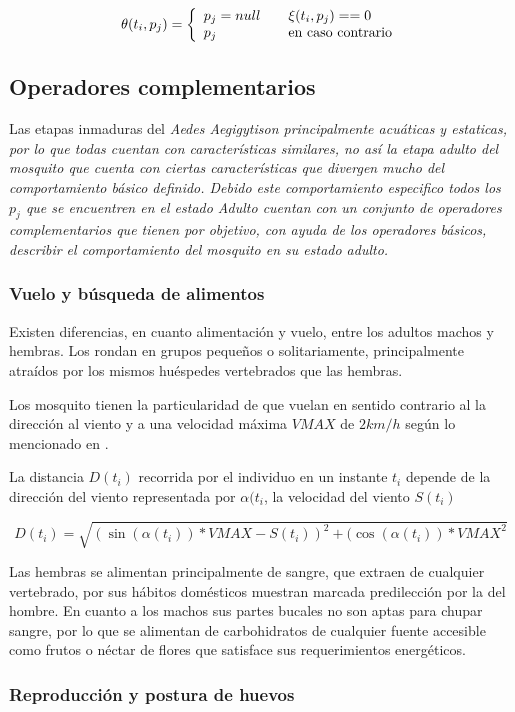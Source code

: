 \begin{equation}
\theta (t_{i}, p_{j}) = \left\{
  \begin{array}{l l}
    p_{j} = null & \quad \xi(t_{i}, p_{j}) == 0 \\
    p_{j} & \quad \text{en caso contrario}
  \end{array} \right.
\end{equation}

\subsection{Operadores complementarios}
Las etapas inmaduras del \em Aedes Aegigyti\em son principalmente acuáticas
y estaticas, por lo que todas cuentan con características similares, no
así la etapa adulto del mosquito que cuenta con ciertas características
que divergen mucho del comportamiento básico definido. Debido este
comportamiento especifico todos los $p_{j}$ que se encuentren en el estado
\em Adulto \em cuentan con un conjunto de operadores complementarios que
tienen por objetivo, con ayuda de los operadores básicos, describir el
comportamiento del mosquito en su estado adulto.

\subsubsection{Vuelo y búsqueda de alimentos}
Existen diferencias, en cuanto alimentación y vuelo, entre los adultos
machos y hembras. Los rondan en grupos pequeños o solitariamente,
principalmente atraídos por los mismos huéspedes vertebrados que las hembras.

Los mosquito tienen la particularidad de que vuelan en sentido contrario
al la dirección al viento y a una velocidad máxima $VMAX$ de $2 km/h$ según lo
mencionado en \cite{web-site:speedAnimals}.

La distancia $D(t_{i})$ recorrida por el individuo en un instante $t_{i}$
depende de la dirección del viento representada por $\alpha(t_{i}$, la
velocidad del viento $S(t_{i})$

\begin{equation}
 D (t_{i}) = \sqrt{{(\sin(\alpha(t_{i})) * VMAX  - S(t_{i}))}^{2}
  + {(\cos(\alpha(t_{i})) * VMAX} ^{2} }
\end{equation}

Las hembras se alimentan principalmente de sangre, que extraen de cualquier
vertebrado, por sus hábitos domésticos muestran marcada predilección por
la del hombre\cite{ThironIzcazaJ2003}. En cuanto a los machos sus partes
bucales no son aptas para chupar sangre, por lo que se alimentan de
carbohidratos de cualquier fuente accesible como frutos o néctar de flores
que satisface sus requerimientos energéticos.

\subsubsection{Reproducción y postura de huevos}
